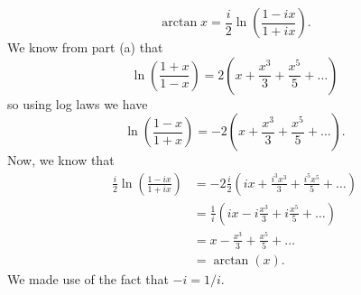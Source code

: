 \documentclass{article}
\begin{document}
\begin{enumerate}
\begin{enumerate}
{			\begin{equation*}
				\arctan x = \frac{i}{2} \ln \left(\frac{1-ix}{1+ix}\right).
			\end{equation*}
			We know from part (a) that 
			\begin{equation*}
				\ln \left( \frac{1+x}{1-x} \right) = 2 \left( x + \frac{x^3}{3} + \frac{x^5}{5} + \ldots \right) 
			\end{equation*}
			so using log laws we have
			\begin{equation*}
				\ln \left( \frac{1-x}{1+x} \right) = - 2 \left( x + \frac{x^3}{3} + \frac{x^5}{5} + \ldots \right) .
			\end{equation*}
			Now, we know that 
			\begin{align*}
				\frac{i}{2} \ln \left( \frac{1-ix}{1+ix} \right) &= - 2\frac{i}{2} \left( ix + \frac{i^3 x^3}{3} + \frac{i^5 x^5}{5} + \ldots \right) \\
				&= \frac{1}{i} \left( ix -i \frac{x^3}{3} + i \frac{x^5}{5} + \ldots \right) \\
				&= x - \frac{x^3}{3} + \frac{x^5}{5} + \ldots \\
				&= \arctan (x) .
			\end{align*}
			We made use of the fact that $-i = 1/i$.
		}
	\end{enumerate}
\end{enumerate}
\end{document}
